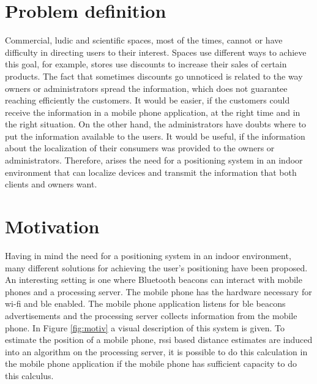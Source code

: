

\section{Problem definition}
\label{section:problem}

Commercial, ludic and scientific spaces, most of the times, cannot or have difficulty in directing users to their interest. Spaces use different ways to achieve this goal, for example, stores use discounts to increase their sales of certain products. The fact that sometimes discounts go unnoticed is related to the way owners or administrators spread the information, which does not guarantee reaching efficiently the customers. It would be easier, if the customers could receive the information in a mobile phone application, at the right time and in the right situation. On the other hand, the administrators have doubts where to put the information available to the users. It would be useful, if the information about the localization of their consumers was provided to the owners or administrators. 
Therefore, arises the need for a positioning system in an indoor environment that can localize devices and transmit the information that both clients and owners want.
%
\section{Motivation}
\label{section:motivation}
Having in mind the need for a positioning system in an indoor environment, many different solutions for achieving the user's positioning have been proposed. An interesting setting is one where Bluetooth beacons can interact with mobile phones and a processing server. The mobile phone has the hardware necessary for \gls{wi-fi} and \gls{ble} enabled. The mobile phone application listens for \gls{ble} beacons advertisements and the processing server collects information from the mobile phone. In Figure \ref{fig:motiv} a visual description of this system is given.
To estimate the position of a mobile phone, \gls{rssi} based distance estimates are induced into an algorithm on the processing server, it is possible to do this calculation in the mobile phone application if the mobile phone has sufficient capacity to do this calculus.

